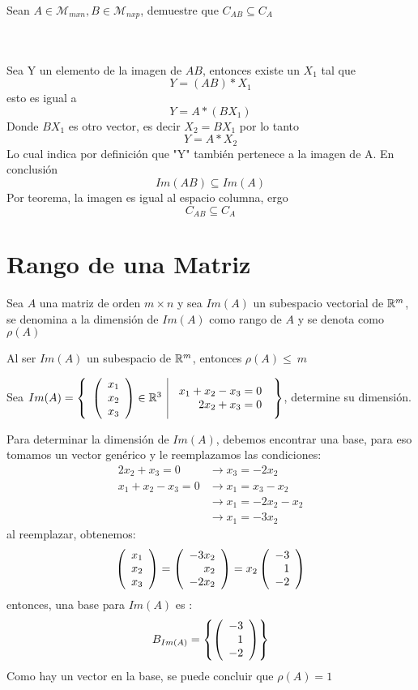 \newpage
\begin{ejercicio}
Sean $A\in \mathcal{M}_{mxn}, B \in \mathcal{M}_{nxp}$, demuestre que $C_{AB}\subseteq C_A$


\sol
~\\
~\\
Sea Y un elemento de la imagen de $AB$, entonces existe un $X_1$ tal que 
$$Y=(AB)*X_1$$
esto es igual a 
$$Y=A*(BX_1)$$
Donde $BX_1$ es otro vector, es decir $X_2=BX_1$
por lo tanto
$$Y=A*X_2$$
Lo cual indica por definición que "Y" también pertenece a la imagen de A.
En conclusión $$Im(AB) \subseteq Im(A)$$
Por teorema, la imagen es igual al espacio columna, ergo
$$C_{AB} \subseteq C_A$$

\end{ejercicio}

\newpage
\section{Rango de una Matriz}
\begin{dfn}
Sea $A$ una matriz de orden $m\times n$ y sea $Im(A)$ un subespacio vectorial de $\mathbb{R}^m$, se denomina a la dimensión de $Im(A)$ como rango de $A$ y se denota como $\rho(A)$ 
\end{dfn}
\begin{theorem}[Corolario]
Al ser $Im(A)$ un subespacio de $\mathbb{R}^m$, entonces $\rho(A) \leq~m$
\end{theorem} 

\begin{ejemplo}
Sea $Im(A)= \left\{\begin{array}{c|c} {\left( \begin{array}{c} x_1\\ x_2\\ x_3 \end{array}\right) \in \mathbb{R}^3 }&{\begin{array}{r}
    x_1 + x_2 - x_3 = 0\\
    2x_2 + x_3 = 0
\end{array}} \end{array} \right\}$, determine su dimensión.
\end{ejemplo}
\sol 
Para determinar la dimensión de $Im(A)$, debemos encontrar una base, para eso tomamos un vector genérico y le reemplazamos las condiciones:
\begin{align*}
    2x_2 + x_3 = 0 &\rightarrow x_3 = -2x_2\\
    x_1 + x_2 - x_3 = 0 &\rightarrow x_1 = x_3 - x_2\\ 
    &\rightarrow x_1 = -2x_2 - x_2\\
    &\rightarrow x_1 = -3x_2
\end{align*}
al reemplazar, obtenemos:
\[ \left( \begin{array}{r} x_1\\ x_2\\ x_3 \end{array} \right)  = \left( \begin{array}{r} -3x_2\\ x_2\\ -2x_2 \end{array} \right)   = x_2\left( \begin{array}{r} -3\\ 1\\ -2 \end{array} \right) \]
entonces, una base para $Im(A)$ es :
$$B_{Im(A)} =  \left\{\left( \begin{array}{r} -3\\ 1\\ -2 \end{array} \right)  \right\} $$
Como hay un vector en la base, se puede concluir que $\rho(A) = 1$\\

